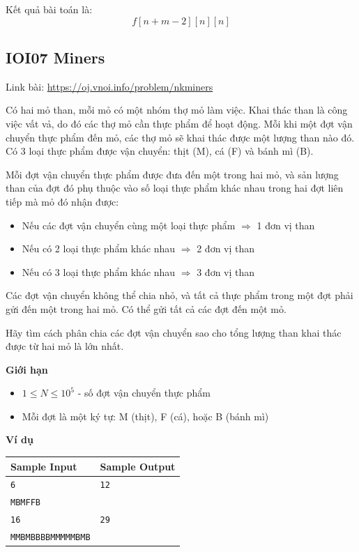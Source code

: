 \documentclass{article}
\begin{document}
Kết quả bài toán là: 
\[
\boxed{f[n + m - 2][n][n]}
\]

\subsection{IOI07 Miners}
Link bài: \url{https://oj.vnoi.info/problem/nkminers}

\begin{tcolorbox}[
    colback=blue!5,
    colframe=blue!75!black,
    title={Đề bài}
]
Có hai mỏ than, mỗi mỏ có một nhóm thợ mỏ làm việc. Khai thác than là công việc vất vả, do đó các thợ mỏ cần thực phẩm để hoạt động. Mỗi khi một đợt vận chuyển thực phẩm đến mỏ, các thợ mỏ sẽ khai thác được một lượng than nào đó. Có 3 loại thực phẩm được vận chuyển: thịt (M), cá (F) và bánh mì (B).

Mỗi đợt vận chuyển thực phẩm được đưa đến một trong hai mỏ, và sản lượng than của đợt đó phụ thuộc vào số loại thực phẩm khác nhau trong hai đợt liên tiếp mà mỏ đó nhận được:
\begin{itemize}
    \item Nếu các đợt vận chuyển cùng một loại thực phẩm $\Rightarrow$ 1 đơn vị than
    \item Nếu có 2 loại thực phẩm khác nhau $\Rightarrow$ 2 đơn vị than
    \item Nếu có 3 loại thực phẩm khác nhau $\Rightarrow$ 3 đơn vị than
\end{itemize}

Các đợt vận chuyển không thể chia nhỏ, và tất cả thực phẩm trong một đợt phải gửi đến một trong hai mỏ. Có thể gửi tất cả các đợt đến một mỏ.

Hãy tìm cách phân chia các đợt vận chuyển sao cho tổng lượng than khai thác được từ hai mỏ là lớn nhất.
\end{tcolorbox}

\textbf{Giới hạn}
\begin{itemize}
    \item $1 \le N \le 10^5$ - số đợt vận chuyển thực phẩm
    \item Mỗi đợt là một ký tự: M (thịt), F (cá), hoặc B (bánh mì)
\end{itemize}

\textbf{Ví dụ}

\begin{table}[H]
    \centering
    \begin{tabular}{|l|l|}
        \hline
        \textbf{Sample Input} & \textbf{Sample Output} \\
        \hline
        \texttt{6} & \texttt{12} \\
        \texttt{MBMFFB} & \\
        \hline
        \texttt{16} & \texttt{29} \\
        \texttt{MMBMBBBBMMMMMBMB} & \\
        \hline
    \end{tabular}
\end{table}
\end{document}
